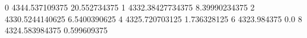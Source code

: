 0 4344.537109375 20.552734375
1 4332.38427734375 8.39990234375
2 4330.5244140625 6.5400390625
4 4325.720703125 1.736328125
6 4323.984375 0.0
8 4324.583984375 0.599609375

